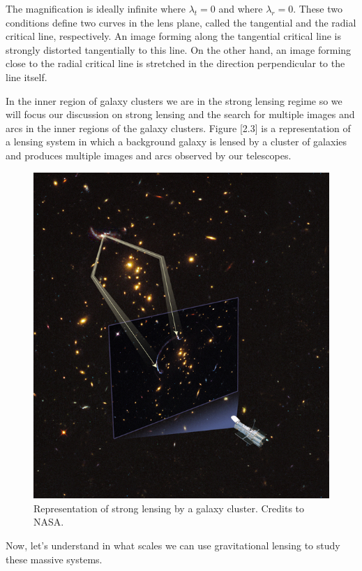 The magnification is ideally infinite where $\lambda_t=0$ and where $\lambda_r=0$. These two conditions define two curves in the lens plane, called the tangential and the radial critical line, respectively. An image forming along the tangential critical line is strongly distorted tangentially to this line. On the other hand, an image forming close to the radial critical line is stretched in the direction perpendicular to the line itself. 

In the inner region of galaxy clusters we are in the strong lensing regime so we will focus our discussion on strong lensing and the search for multiple images and arcs in the inner regions of the galaxy clusters. Figure [2.3] is a representation of a lensing system in which a background galaxy is lensed by a cluster of galaxies and produces multiple images and arcs observed by our telescopes. 

\begin{figure}[H]
\centering
\includegraphics[width=12cm]{images/lensing.jpg}
\caption[Strong Lensing representation]{Representation of strong lensing by a galaxy cluster. Credits to NASA.}
\end{figure}

Now, let's understand in what scales we can use gravitational lensing to study these massive systems.